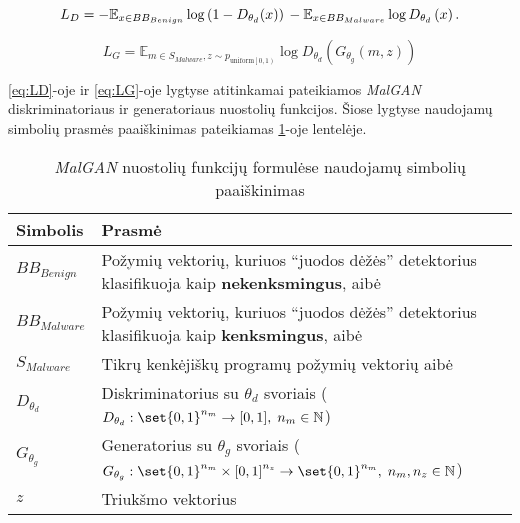 \begin{equation}
    L_{D}= -\mathbb{E}_{x\in BB_{Benign}}\log\left(1-D_{\theta_{d}}(x)\right)\\-\mathbb{E}_{x\in BB_{Malware}}\log D_{\theta_{d}}\left(x\right).\label{eq:LD}
\end{equation}

\begin{equation}
    L_G= \mathbb{E}_{m \in S_{Malware},z \sim p_{\mathrm{uniform} \left[0,1\right) }} \log D_{\theta_d} \left(G_{\theta_g} \left(m,z\right) \right)\label{eq:LG}
\end{equation}

\ref{eq:LD}-oje ir \ref{eq:LG}-oje lygtyse atitinkamai pateikiamos \textit{MalGAN} diskriminatoriaus ir generatoriaus nuostolių funkcijos. Šiose lygtyse naudojamų simbolių prasmės paaiškinimas pateikiamas \ref{tab:eq_explain}-oje lentelėje.

\begin{table}[h]
    \begin{small}
        \begin{center}
            \begin{tabular}[c]{l|p{}}
                Simbolis       & Prasmė                                                                                                                                           \\
                \midrule
                $BB_{Benign}$  & Požymių vektorių, kuriuos \enquote{juodos dėžės} detektorius klasifikuoja kaip \textbf{nekenksmingus}, aibė                                      \\

                $BB_{Malware}$ & Požymių vektorių, kuriuos \enquote{juodos dėžės} detektorius klasifikuoja kaip \textbf{kenksmingus}, aibė                                        \\

                $S_{Malware}$  & Tikrų kenkėjiškų programų požymių vektorių aibė                                                                                                  \\

                $D_{\theta_d}$ & Diskriminatorius su $\theta_d$ svoriais ($D_{\theta_d}: \set{0,1}^{n_m} \rightarrow [0,1], \; n_m \in \mathbb{N}$)                               \\

                $G_{\theta_g}$ & Generatorius su $\theta_g$ svoriais ($G_{\theta_g}: \set{0,1}^{n_m} \times {[0,1]}^{n_z} \rightarrow \set{0,1}^{n_m}, \; n_m, n_z \in \mathbb{N}$) \\

                $z$            & Triukšmo vektorius                                                                                                                               \\

            \end{tabular}
        \end{center}
        \caption{\textit{MalGAN} nuostolių funkcijų formulėse naudojamų simbolių paaiškinimas}\label{tab:eq_explain}
    \end{small}
\end{table}
